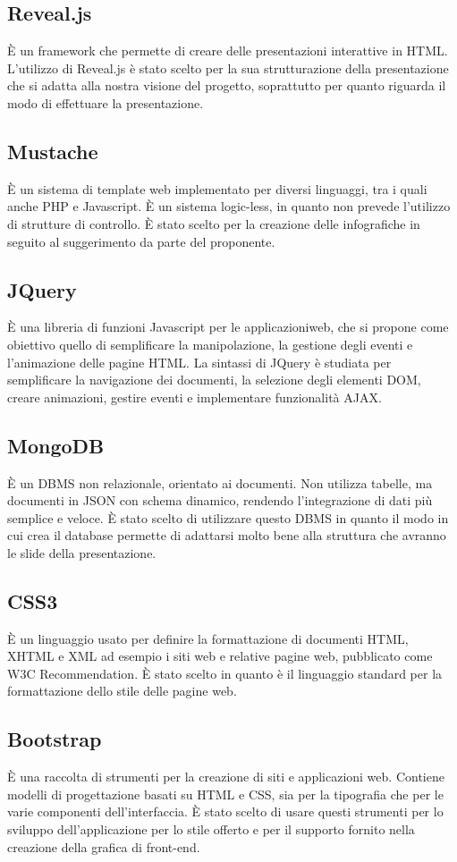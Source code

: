 \subsection{Reveal.js}
È un \gls{framework} che permette di creare delle presentazioni interattive in \gls{HTML}.
L'utilizzo di \gls{Reveal.js} è stato scelto per la sua strutturazione della presentazione che si adatta alla nostra visione del progetto, soprattutto per quanto riguarda il modo di effettuare la presentazione.

\subsection{Mustache}
È un sistema di \gls{template} web implementato per diversi linguaggi, tra i quali anche \gls{PHP} e \gls{Javascript}. È un sistema logic-less, in quanto non prevede l'utilizzo di strutture di controllo.
È stato scelto per la creazione delle infografiche in seguito al suggerimento da parte del proponente.

\subsection{JQuery}
È una libreria di funzioni \gls{Javascript} per le applicazioniweb, che si propone come obiettivo quello di semplificare la manipolazione, la gestione degli eventi e l'animazione delle pagine \gls{HTML}. La sintassi di \gls{JQuery} è studiata per semplificare la navigazione dei documenti, la selezione degli elementi DOM, creare animazioni, gestire eventi e implementare funzionalità \gls{AJAX}.

\subsection{MongoDB}
È un DBMS non relazionale, orientato ai documenti. Non utilizza tabelle, ma documenti in \gls{JSON} con schema dinamico, rendendo l'integrazione di dati più semplice e veloce.
È stato scelto di utilizzare questo DBMS in quanto il modo in cui crea il \gls{database} permette di adattarsi molto bene alla struttura che avranno le \gls{slide} della presentazione.

\subsection{CSS3}
È un linguaggio usato per definire la formattazione di documenti \gls{HTML}, XHTML e XML ad esempio i siti web e relative pagine web, pubblicato come \gls{W3C} Recommendation.
È stato scelto in quanto è il linguaggio standard per la formattazione dello stile delle pagine web.

\subsection{Bootstrap}
È una raccolta di strumenti per la creazione di siti e applicazioni web. Contiene modelli di progettazione basati su \gls{HTML} e \gls{CSS}, sia per la tipografia che per le varie componenti dell'interfaccia.
È stato scelto di usare questi strumenti per lo sviluppo dell'applicazione per lo stile offerto e per il supporto fornito nella creazione della grafica di \gls{front-end}.
